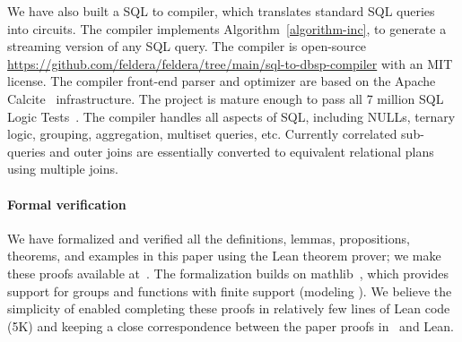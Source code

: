 We have also built a SQL to \dbsp compiler, which translates standard
SQL queries into \dbsp circuits.  The compiler implements
Algorithm~\ref{algorithm-inc}, to generate a streaming version of any
SQL query.  The compiler is open-source
\url{https://github.com/feldera/feldera/tree/main/sql-to-dbsp-compiler} with
an MIT license.  The compiler front-end parser and optimizer are based
on the Apache Calcite~\cite{begoli-icmd18} infrastructure.  The
project is mature enough to pass all 7 million SQL Logic
Tests~\cite{sqllogictest}.  The compiler handles all aspects of SQL,
including NULLs, ternary logic, grouping, aggregation, multiset
queries, etc.  Currently correlated sub-queries and outer joins are
essentially converted to equivalent relational plans using multiple
joins.

\paragraph{Formal verification}

We have formalized and verified all the definitions, lemmas,
propositions, theorems, and examples in this paper using the Lean theorem prover; we make
these proofs available at~\cite{dbsp-theory}.
The formalization builds on mathlib~\cite{mathlib2020}, which provides
support for groups and functions with finite support (modeling
\zrs). We believe the simplicity of \dbsp enabled completing these
proofs in relatively few lines of Lean code (5K) and keeping a close
correspondence between the paper proofs in~\cite{tr} and Lean.
